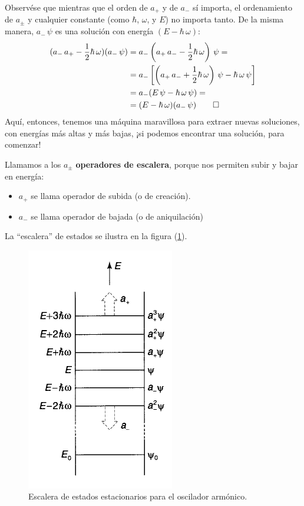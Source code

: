 Observése que mientras que el orden de $a_{+}$ y de $a_{-}$ sí importa, el ordenamiento de $a_{\pm}$ y cualquier constante (como $\hbar$, $\omega$, y $E$) no importa tanto. De la misma manera, $a_{-} \, \psi$ es una solución con energía $(E - \hbar \, \omega)$:
\begin{align*}
(a_{-} \, a_{+} - \dfrac{1}{2} \hbar \, \omega) (a_{-} \, \psi) &= a_{-} \left( a_{+} \, a_{-} - \dfrac{1}{2} \hbar \, \omega \right) \, \psi = \\
&= a_{-} \left[ \left( a_{+} \, a_{-} + \dfrac{1}{2} \hbar \, \omega \right) \, \psi - \hbar \, \omega \, \psi \right] \\
&= a_{-} (E \, \psi - \hbar \, \omega \, \psi) = \\
&= (E - \hbar \, \omega) (a_{-} \, \psi) \qed
\end{align*}
Aquí, entonces, tenemos una máquina maravillosa para extraer nuevas soluciones, con energías más altas y más bajas, ¡si podemos encontrar una solución, para comenzar!
\par
Llamamos a los $a_{\pm}$ \textbf{operadores de escalera}, porque nos permiten subir y bajar en energía:
\begin{itemize}
\item $a_{+}$ se llama operador de subida (o de creación).
\item $a_{-}$ se llama operador de bajada (o de aniquilación) 
\end{itemize}
La \enquote{escalera} de estados se ilustra en la figura (\ref{fig:figura_002}).
\begin{figure}[H]
    \centering
    \includegraphics[scale=0.7]{Imagenes/Operadores_escalera.png}
    \caption{Escalera de estados estacionarios para el oscilador armónico.}
    \label{fig:figura_002}
\end{figure}
